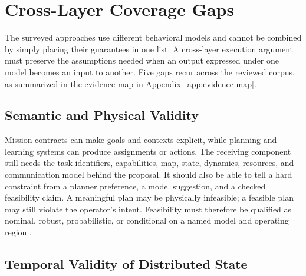 \section{Cross-Layer Coverage Gaps}
\label{sec:gaps}

The surveyed approaches use different behavioral models and cannot be combined
by simply placing their guarantees in one list.  A cross-layer execution
argument must preserve the assumptions needed when an output expressed under
one model becomes an input to another.  Five gaps recur across the reviewed
corpus, as summarized in the evidence map in Appendix~\ref{app:evidence-map}.

\subsection{Semantic and Physical Validity}

Mission contracts can make goals and contexts explicit, while planning and
learning systems can produce assignments or actions.  The receiving component
still needs the task identifiers, capabilities, map, state, dynamics, resources,
and communication model behind the proposal.  It should also be able to tell a
hard constraint from a planner preference, a model suggestion, and a checked
feasibility claim.  A meaningful plan may be physically infeasible; a feasible
plan may still violate the operator's intent.  Feasibility must therefore be
qualified as nominal, robust, probabilistic, or conditional on a named model and
operating region
\cite{mallozzi2020crome,mallozzi2022repair,mandi2023roco,obata2024lipllm,
chaki2013probabilistic}.

\subsection{Temporal Validity of Distributed State}

